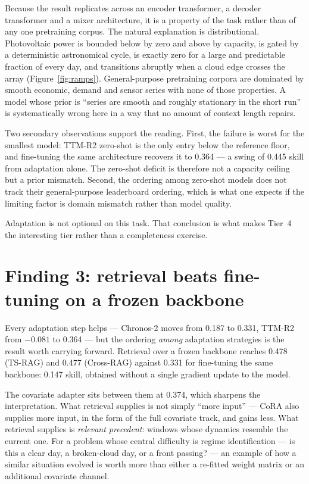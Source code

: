 Because the result replicates across an encoder transformer, a decoder transformer and a
mixer architecture, it is a property of the task rather than of any one pretraining corpus.
The natural explanation is distributional. Photovoltaic power is bounded below by zero and
above by capacity, is gated by a deterministic astronomical cycle, is exactly zero for a
large and predictable fraction of every day, and transitions abruptly when a cloud edge
crosses the array (Figure~\ref{fig:ramps}). General-purpose pretraining corpora are dominated
by smooth economic, demand and sensor series with none of those properties. A model whose
prior is ``series are smooth and roughly stationary in the short run'' is systematically
wrong here in a way that no amount of context length repairs.

Two secondary observations support the reading. First, the failure is worst for the smallest
model: TTM-R2 zero-shot is the only entry below the reference floor, and fine-tuning the same
architecture recovers it to 0.364 --- a swing of 0.445 skill from adaptation alone. The
zero-shot deficit is therefore not a capacity ceiling but a prior mismatch. Second, the
ordering among zero-shot models does not track their general-purpose leaderboard ordering,
which is what one expects if the limiting factor is domain mismatch rather than model
quality.

Adaptation is not optional on this task. That conclusion is what makes Tier~4 the interesting
tier rather than a completeness exercise.

\section{Finding 3: retrieval beats fine-tuning on a frozen backbone}
\label{sec:finding3}

Every adaptation step helps --- Chronos-2 moves from 0.187 to 0.331, TTM-R2 from $-0.081$ to
0.364 --- but the ordering \emph{among} adaptation strategies is the result worth carrying
forward. Retrieval over a frozen backbone reaches 0.478 (TS-RAG) and 0.477 (Cross-RAG)
against 0.331 for fine-tuning the same backbone: 0.147 skill, obtained without a single
gradient update to the model.

The covariate adapter sits between them at 0.374, which sharpens the interpretation. What
retrieval supplies is not simply ``more input'' --- CoRA also supplies more input, in the form
of the full covariate track, and gains less. What retrieval supplies is \emph{relevant
precedent}: windows whose dynamics resemble the current one. For a problem whose central
difficulty is regime identification --- is this a clear day, a broken-cloud day, or a front
passing? --- an example of how a similar situation evolved is worth more than either a
re-fitted weight matrix or an additional covariate channel.

